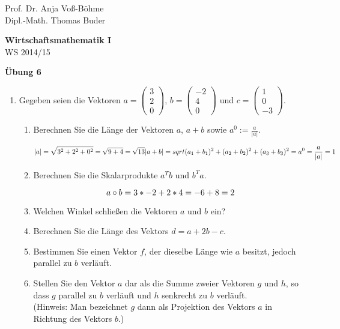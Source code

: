 \documentclass[12pt,a4paper]{scrreprt}
\begin{document}
\begin{flushleft}
Prof. Dr. Anja Voß-Böhme \\
Dipl.-Math. Thomas Buder
\end{flushleft}

\begin{center}
\large{\textbf{ Wirtschaftsmathematik I}} \\
WS 2014/15 \end{center}

\begin{center}\large{\textbf{ Übung 6 }} \end{center}

\bigskip
\begin{enumerate}
	\item	Gegeben seien die Vektoren %
		$a=\begin{pmatrix}
			3 \\
			2\\
			0
		\end{pmatrix}$,
		$b=\begin{pmatrix}
			-2 \\
			4 \\
			0
		\end{pmatrix}$ und
		$c=\begin{pmatrix}
			1 \\
			0 \\
			-3
		\end{pmatrix}.$
	\begin{enumerate}
		\item Berechnen Sie die Länge der Vektoren $a$, $a+b$ sowie $a^0:=\frac{a}{|a|}$.

		\[
			|a| = \sqrt{3^2+2^2+0^2} = \sqrt{9+4} = \sqrt{13} \\
			|a+b| = sqrt{(a_1+b_1)^2+(a_2+b_2)^2+(a_3+b_3)^2} = \\
			a^0 = \frac{a}{|a|} = 1 \\
		\]

	\item Berechnen Sie die Skalarprodukte $a^Tb$ und $b^Ta$.

		\[
a \circ b = 3*-2+2*4 = -6+8 = 2 \\
		\]

	\item Welchen Winkel schließen die Vektoren $a$ und $b$
 ein?
	\item Berechnen Sie die Länge des Vektors $d=a+2b-c.$
	\item Bestimmen Sie einen Vektor $f$, der dieselbe Länge wie $a$ besitzt, jedoch parallel zu $b$ verläuft.
	\item Stellen Sie den Vektor $a$ dar als die Summe zweier Vektoren $g$ und $h$, so dass $g$ parallel zu $b$ verläuft und $h$ senkrecht zu $b$ verläuft. \\
(Hinweis: Man bezeichnet $g$ dann als Projektion des Vektors $a$ in Richtung des Vektors $b$.)


\end{enumerate}
\end{enumerate}
\end{document}
